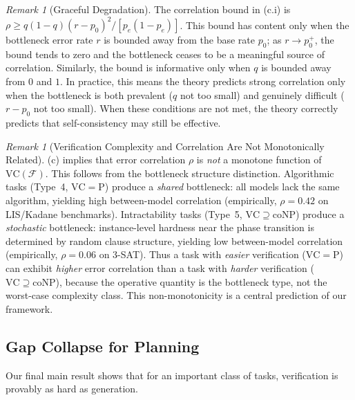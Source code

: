 \documentclass{article}
\theoremstyle{definition}
\theoremstyle{remark}
\newtheorem{remark}[theorem]{Remark}
\newcommand{\PTIME}{\mathrm{P}}
\newcommand{\coNP}{\mathrm{coNP}}
\newcommand{\VC}{\mathrm{VC}}           %
\newcommand{\calF}{\mathcal{F}}         %
\begin{document}
\begin{remark}[Graceful Degradation]
\label{rem:degradation}
The correlation bound in (c.i) is $\rho \geq q(1-q)(r - p_0)^2 / [p_e(1-p_e)]$.
This bound has content only when the bottleneck error rate $r$ is bounded away from the base rate $p_0$; as $r \to p_0^+$, the bound tends to zero and the bottleneck ceases to be a meaningful source of correlation.
Similarly, the bound is informative only when $q$ is bounded away from $0$ and $1$.
In practice, this means the theory predicts strong correlation only when the bottleneck is both prevalent ($q$ not too small) and genuinely difficult ($r - p_0$ not too small).
When these conditions are not met, the theory correctly predicts that self-consistency may still be effective.
\end{remark}

\begin{remark}[Verification Complexity and Correlation Are Not Monotonically Related]
\label{rem:nonmonotone}
(c) implies that error correlation $\rho$ is \emph{not} a monotone function of $\VC(\calF)$.
This follows from the bottleneck structure distinction.
Algorithmic tasks (Type~4, $\VC = \PTIME$) produce a \emph{shared} bottleneck: all models lack the same algorithm, yielding high between-model correlation (empirically, $\rho = 0.42$ on LIS/Kadane benchmarks).
Intractability tasks (Type~5, $\VC \supseteq \coNP$) produce a \emph{stochastic} bottleneck: instance-level hardness near the phase transition is determined by random clause structure, yielding low between-model correlation (empirically, $\rho = 0.06$ on 3-SAT).
Thus a task with \emph{easier} verification ($\VC = \PTIME$) can exhibit \emph{higher} error correlation than a task with \emph{harder} verification ($\VC \supseteq \coNP$), because the operative quantity is the bottleneck type, not the worst-case complexity class.
This non-monotonicity is a central prediction of our framework.
\end{remark}

\subsection{Gap Collapse for Planning}

Our final main result shows that for an important class of tasks, verification is provably as hard as generation.
\end{document}
